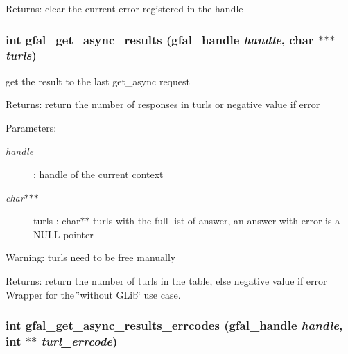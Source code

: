 \begin{Desc}
\item[Returns:]clear the current error registered in the handle \end{Desc}
\subsubsection{\setlength{\rightskip}{0pt plus 5cm}int gfal\_\-get\_\-async\_\-results (gfal\_\-handle {\em handle}, char $\ast$$\ast$$\ast$ {\em turls})}\label{gfal__common__interface_8c_0c654545b837b8e1928842ee762ce5e9}


get the result to the last get\_\-async request \begin{Desc}
\item[Returns:]return the number of responses in turls or negative value if error \end{Desc}
\begin{Desc}
\item[Parameters:]
\begin{description}
\item[{\em handle}]: handle of the current context \item[{\em char$\ast$$\ast$$\ast$}]turls : char$\ast$$\ast$ turls with the full list of answer, an answer with error is a NULL pointer \end{description}
\end{Desc}
\begin{Desc}
\item[Warning:]turls need to be free manually \end{Desc}
\begin{Desc}
\item[Returns:]return the number of turls in the table, else negative value if error Wrapper for the \char`\"{}without GLib\char`\"{} use case. \end{Desc}
\subsubsection{\setlength{\rightskip}{0pt plus 5cm}int gfal\_\-get\_\-async\_\-results\_\-errcodes (gfal\_\-handle {\em handle}, int $\ast$$\ast$ {\em turl\_\-errcode})}\label{gfal__common__interface_8c_2ea6b8dae8f2f76d5e83711fe6ce5510}


